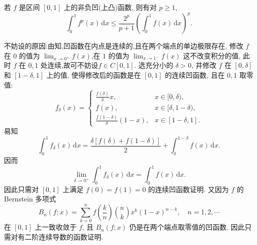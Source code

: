\documentclass[../../main.tex]{subfiles}
\begin{document}
\begin{theorem}[Favard不等式]\label{theorem:Favard(法瓦尔)不等式}
若 \( f \) 是区间 \([0,1]\) 上的非负凹(上凸)函数, 则有对 \( p \geqslant 1 \),
\[
\int_{0}^{1} f^p(x) \, \mathrm{d}x \leqslant \frac{2^p}{p + 1} \left( \int_{0}^{1} f(x) \, \mathrm{d}x \right)^p.
\]
\end{theorem}
\begin{remark}
不妨设的原因:由知,凹函数在内点是连续的,且在两个端点的单边极限存在, 修改 \( f \) 在 \( 0 \) 的值为 \( \lim_{x \to 0^+} f(x) \),在 \( 1\) 的值为 \( \lim_{x \to 1^-} f(x) \) 这不改变积分的值, 此时 \( f \) 在 \( 0,1 \) 处连续,故可不妨设$f\in C[0,1]$. 选充分小的 \( \delta > 0 \), 并修改 \( f \) 在 \([0,\delta]\) 和 \([1 - \delta,1]\) 上的值, 使得修改后的函数是在 \([0,1]\) 的连续凹函数, 且在 \( 0,1 \) 取零值:
\[
f_{\delta}(x) = \begin{cases} 
\frac{f(\delta)}{\delta} x, & x \in [0,\delta), \\
f(x), & x \in [\delta,1 - \delta), \\
\frac{f(1 - \delta)}{\delta} (1 - x), & x \in [1 - \delta,1].
\end{cases}
\]
易知
\[
\int_{0}^{1} f_{\delta}(x) \, \mathrm{d}x = \frac{\delta [f(\delta) + f(1 - \delta)]}{2} + \int_{\delta}^{1 - \delta} f(x) \, \mathrm{d}x.
\]
因而
\[
\lim_{\delta \to 0^+} \int_{0}^{1} f_{\delta}(x) \, \mathrm{d}x = \int_{0}^{1} f(x) \, \mathrm{d}x.
\]
因此只需对 \([0,1]\) 上满足 \( f(0) = f(1) = 0 \) 的连续凹函数证明. 又因为 \( f \) 的 Bernstein 多项式
\[
B_n(f; x) = \sum_{k=0}^{n} f\left( \frac{k}{n} \right) \binom{n}{k} x^k (1 - x)^{n - k}, \quad n = 1,2,\cdots
\]
在 \([0,1]\) 上一致收敛于 \( f \), 且 \( B_n(f; x) \) 仍是在两个端点取零值的凹函数. 因此只需对有二阶连续导数的函数证明. 
\end{remark}
\end{document}
